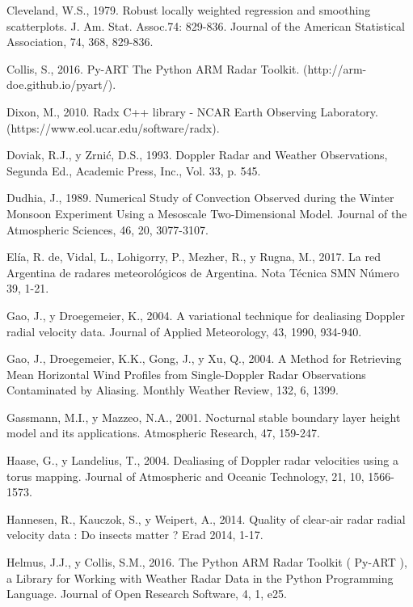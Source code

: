 \documentclass[12pt,spanish,oneside, a4paper]{book}
\begin{document}
\hypertarget{ref-Cleveland1979}{}
Cleveland, W.S., 1979. Robust locally weighted regression and smoothing
scatterplots. J. Am. Stat. Assoc.74: 829-836. Journal of the American
Statistical Association, 74, 368, 829-836.

\hypertarget{ref-Collis2016}{}
Collis, S., 2016. Py-ART The Python ARM Radar Toolkit.
(http://arm-doe.github.io/pyart/).

\hypertarget{ref-Dixon2010}{}
Dixon, M., 2010. Radx C++ library - NCAR Earth Observing Laboratory.
(https://www.eol.ucar.edu/software/radx).

\hypertarget{ref-Doviak1993}{}
Doviak, R.J., y Zrnić, D.S., 1993. Doppler Radar and Weather
Observations, Segunda Ed., Academic Press, Inc., Vol. 33, p. 545.

\hypertarget{ref-Dudhia1989}{}
Dudhia, J., 1989. Numerical Study of Convection Observed during the
Winter Monsoon Experiment Using a Mesoscale Two-Dimensional Model.
Journal of the Atmospheric Sciences, 46, 20, 3077-3107.

\hypertarget{ref-DeElia2017}{}
Elía, R. de, Vidal, L., Lohigorry, P., Mezher, R., y Rugna, M., 2017. La
red Argentina de radares meteorológicos de Argentina. Nota Técnica SMN
Número 39, 1-21.

\hypertarget{ref-Gao2004}{}
Gao, J., y Droegemeier, K., 2004. A variational technique for dealiasing
Doppler radial velocity data. Journal of Applied Meteorology, 43, 1990,
934-940.

\hypertarget{ref-Gao2004a}{}
Gao, J., Droegemeier, K.K., Gong, J., y Xu, Q., 2004. A Method for
Retrieving Mean Horizontal Wind Profiles from Single-Doppler Radar
Observations Contaminated by Aliasing. Monthly Weather Review, 132, 6,
1399.

\hypertarget{ref-Gassmann2001}{}
Gassmann, M.I., y Mazzeo, N.A., 2001. Nocturnal stable boundary layer
height model and its applications. Atmospheric Research, 47, 159-247.

\hypertarget{ref-Haase2004}{}
Haase, G., y Landelius, T., 2004. Dealiasing of Doppler radar velocities
using a torus mapping. Journal of Atmospheric and Oceanic Technology,
21, 10, 1566-1573.

\hypertarget{ref-Hannesen2014}{}
Hannesen, R., Kauczok, S., y Weipert, A., 2014. Quality of clear-air
radar radial velocity data : Do insects matter ? Erad 2014, 1-17.

\hypertarget{ref-Helmus2016}{}
Helmus, J.J., y Collis, S.M., 2016. The Python ARM Radar Toolkit (
Py-ART ), a Library for Working with Weather Radar Data in the Python
Programming Language. Journal of Open Research Software, 4, 1, e25.
\end{document}
